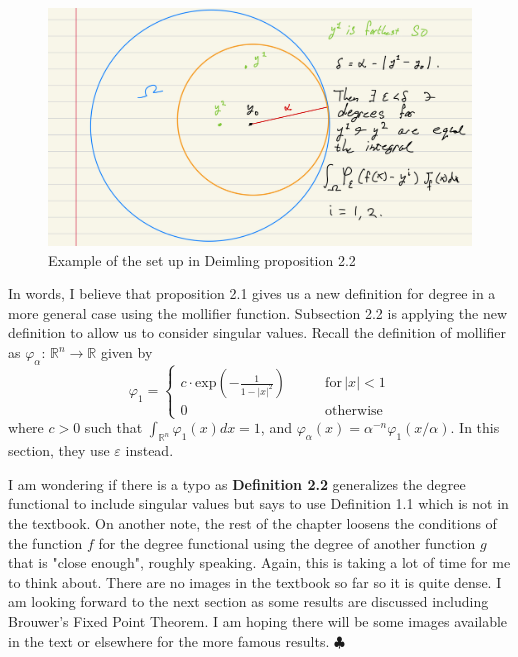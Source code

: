 \documentclass[reqno, 12pt]{article}
\newcommand{\R}{\mathbb{R}}
\newcommand{\END}{\hspace*{\fill} $\clubsuit$}
\begin{document}
\begin{figure}[h!]
	\centering
	\includegraphics[width = .5\textwidth]{subsect2-2.jpeg}
	\caption{Example of the set up in Deimling proposition 2.2}
\end{figure}
In words, I believe that proposition 2.1 gives us a new definition for degree in a more general case using the mollifier function. Subsection 2.2 is applying the new definition to allow us to consider singular values. Recall the definition of mollifier as $\varphi_\alpha : \, \R^n \rightarrow \R$ given by 
$$\varphi_1 = \begin{cases}
	c\cdot \text{exp}\left(-\frac{1}{1- |x|^2}\right) \qquad &\text{for} \, |x| < 1 \\
	0 \qquad &\text{otherwise}
\end{cases}$$
where $c > 0$ such that $\int_{\R^n}\varphi_1(x) dx = 1$, and $\varphi_\alpha(x) = \alpha^{-n}\varphi_1(x/\alpha)$. In this section, they use $\varepsilon$ instead. 

I am wondering if there is a typo as \textbf{Definition 2.2} generalizes the degree functional to include singular values but says to use Definition 1.1 which is not in the textbook. On another note, the rest of the chapter loosens the conditions of the function $f$ for the degree functional using the degree of another function $g$ that is "close enough", roughly speaking. Again, this is taking a lot of time for me to think about. There are no images in the textbook so far so it is quite dense. I am looking forward to the next section as some results are discussed including Brouwer's Fixed Point Theorem. I am hoping there will be some images available in the text or elsewhere for the more famous results. \END
\end{document}
